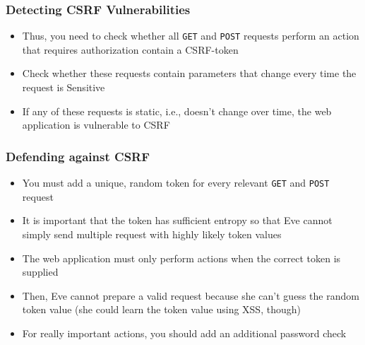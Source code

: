 \begin{frame}
    \frametitle{Detecting CSRF Vulnerabilities}
    \begin{itemize}
        \item Thus, you need to check whether all \texttt{GET} and \texttt{POST} requests perform an action that requires authorization contain a CSRF-token  
        \item Check whether these requests contain parameters that change every time the request is Sensitive
        \item If any of these requests is static, i.e., doesn't change over time, the web application is vulnerable to CSRF
    \end{itemize}
\end{frame}

\begin{frame}
    \frametitle{Defending against CSRF}
    \begin{itemize}
        \item You must add a unique, random token for every relevant \texttt{GET} and \texttt{POST} request
        \item It is important that the token has sufficient entropy so that Eve cannot simply send multiple request with highly likely token values
        \item The web application must only perform actions when the correct token is supplied
        \item Then, Eve cannot prepare a valid request because she can't guess the random token value (she could learn the token value using XSS, though) 
        \item For really important actions, you should add an additional password check
    \end{itemize}
\end{frame}